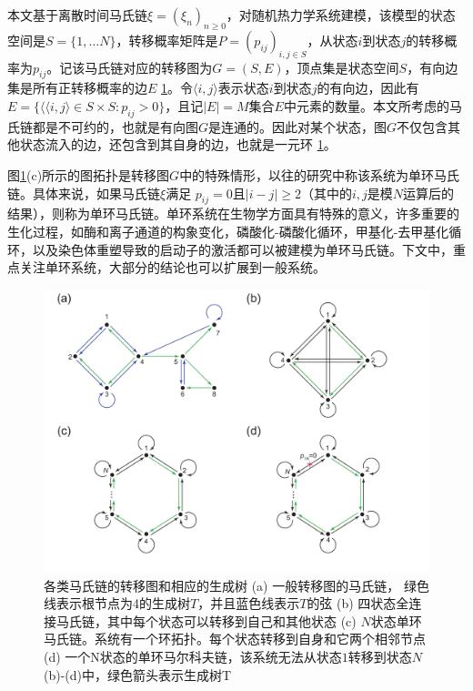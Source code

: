 
本文基于离散时间马氏链$\xi = (\xi_n)_{n \ge 0}$，对随机热力学系统建模，该模型的状态空间是$S = \{1, \dots N\}$，转移概率矩阵是$P=(p_{ij})_{i,j \in S}$，从状态$i$到状态$j$的转移概率为$p_{ij}$。记该马氏链对应的转移图为$G=(S, E)$，顶点集是状态空间$S$，有向边集是所有正转移概率的边$E$ \ref{figure:transitiongraph}。令$\langle i, j\rangle$表示状态$i$到状态$j$的有向边，因此有$E = \{\langle \langle i, j\rangle \in S \times S: p_{ij}>0\}$，且记$|E| = M$集合$E$中元素的数量。本文所考虑的马氏链都是不可约的，也就是有向图$G$是连通的。因此对某个状态，图$G$不仅包含其他状态流入的边，还包含到其自身的边，也就是一元环 \ref{figure:transitiongraph}。

图\ref{figure:transitiongraph}(c)所示的图拓扑是转移图$G$中的特殊情形，以往的研究中称该系统为单环马氏链。具体来说，如果马氏链$\xi$满足 $p_{ij}=0$且$|i-j| \ge 2$（其中的$i,j$是模$N$运算后的结果），则称为单环马氏链。单环系统在生物学方面具有特殊的意义，许多重要的生化过程，如酶和离子通道的构象变化\cite{cornish2013fundamentals,sakmann2013single}，磷酸化-磷酸化循环\cite{beard2008chemical}，甲基化-去甲基化循环\cite{jia2017nonequilibrium}，以及染色体重塑导致的启动子的激活\cite{pedraza2008effects,jia2022analytical}都可以被建模为单环马氏链。下文中，重点关注单环系统，大部分的结论也可以扩展到一般系统。

\begin{figure}[h]\label{figure:transitiongraph}
\centering
\includegraphics[scale=0.5]{chart/transitiongraph.pdf}
\caption{各类马氏链的转移图和相应的生成树 (a) 一般转移图的马氏链， 绿色线表示根节点为4的生成树$T$，并且蓝色线表示$T$的弦 (b) 四状态全连接马氏链，其中每个状态可以转移到自己和其他状态 (c) 
$N$状态单环马氏链。系统有一个环拓扑。每个状态转移到自身和它两个相邻节点 (d) 一个N状态的单环马尔科夫链，该系统无法从状态$1$转移到状态$N$ (b)-(d)中，绿色箭头表示生成树T}
\end{figure}

